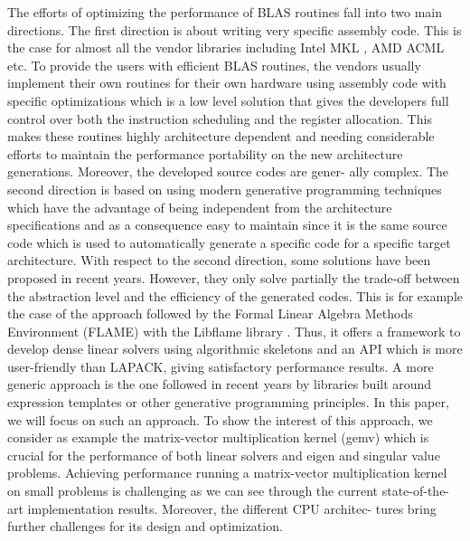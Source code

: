 \documentclass[../../main.tex]{subfiles}
\begin{document}
The efforts of optimizing the performance of BLAS routines
fall into two main directions. The first direction is about
writing very specific assembly code. This is the case for
almost all the vendor libraries including Intel MKL \cite{hpcs1},
AMD ACML \cite{hpcs2} etc. To provide the users with efficient BLAS
routines, the vendors usually implement their own routines
for their own hardware using assembly code with specific
optimizations which is a low level solution that gives the
developers full control over both the instruction scheduling
and the register allocation. This makes these routines highly
architecture dependent and needing considerable efforts to
maintain the performance portability on the new architecture
generations. Moreover, the developed source codes are gener-
ally complex. The second direction is based on using modern
generative programming techniques which have the advantage
of being independent from the architecture specifications and
as a consequence easy to maintain since it is the same source
code which is used to automatically generate a specific code
for a specific target architecture. With respect to the second
direction, some solutions have been proposed in recent years.
However, they only solve partially the trade-off between the
abstraction level and the efficiency of the generated codes.
This is for example the case of the approach followed by
the Formal Linear Algebra Methods Environment (FLAME)
with the Libflame library \cite{hpcs3}. Thus, it offers a framework to
develop dense linear solvers using algorithmic skeletons \cite{hpcs4}
and an API which is more user-friendly than LAPACK, giving
satisfactory performance results. A more generic approach is
the one followed in recent years by \cpp libraries built around
expression templates \cite{hpcs5} or other generative programming \cite{hpcs6}
principles. In this paper, we will focus on such an approach.
To show the interest of this approach, we consider as
example the matrix-vector multiplication kernel (gemv) which
is crucial for the performance of both linear solvers and eigen
and singular value problems. Achieving performance running
a matrix-vector multiplication kernel on small problems is
challenging as we can see through the current state-of-the-art
implementation results. Moreover, the different CPU architec-
tures bring further challenges for its design and optimization.
\end{document}
